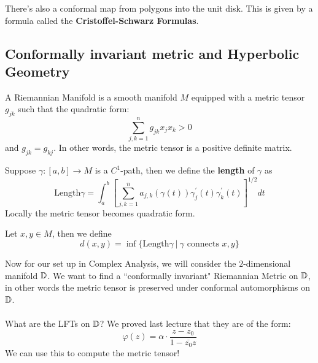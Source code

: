 There's also a conformal map from polygons into the unit disk. This is given by a formula called the \textbf{Cristoffel-Schwarz Formulas}.

\subsection{Conformally invariant metric and Hyperbolic Geometry}

\begin{definition}
    A Riemannian Manifold is a smooth manifold $M$ equipped with a metric tensor $g_{jk}$ such that the quadratic form:
    \[\sum_{j, k = 1}^n  g_{jk} x_j x_k > 0\]
    and $g_{jk} = g_{kj}$. In other words, the metric tensor is a positive definite matrix.
\end{definition}

\begin{definition}
    Suppose $\gamma: [a, b] \to M$ is a $C^1$-path, then we define the \textbf{length} of $\gamma$ as
    \[\text{Length} \gamma = \int_a^b [\sum_{j,k = 1}^n a_{j, k} (\gamma(t)) \gamma_j^'(t) \gamma_k^'(t)]^{1/2} dt\]
    Locally the metric tensor becomes quadratic form.
\end{definition}

\begin{definition}
    Let $x, y \in M$, then we define
    \[d(x, y) = \inf \{\text{Length} \gamma\ |\ \gamma \text{ connects } x, y\}\]
\end{definition}

Now for our set up in Complex Analysis, we will consider the $2$-dimensional manifold $\mathbb{D}$. We want to find a ``conformally invariant" Riemannian Metric on $\mathbb{D}$, in other words the metric tensor is preserved under conformal automorphisms on $\mathbb{D}$.\\\\

What are the LFTs on $\mathbb{D}$? We proved last lecture that they are of the form:
\[\varphi(z) = \alpha \cdot \frac{z - z_0}{1 - \overline{z_0} z}\]
We can use this to compute the metric tensor!

